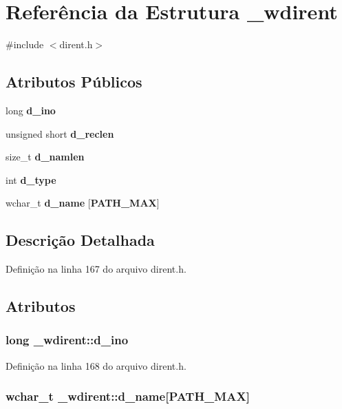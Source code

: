 \section{Referência da Estrutura \+\_\+wdirent}
\label{struct__wdirent}


{\ttfamily \#include $<$dirent.\+h$>$}

\subsection*{Atributos Públicos}
\begin{DoxyCompactItemize}
\item 
long {\bf d\+\_\+ino}
\item 
unsigned short {\bf d\+\_\+reclen}
\item 
size\+\_\+t {\bf d\+\_\+namlen}
\item 
int {\bf d\+\_\+type}
\item 
wchar\+\_\+t {\bf d\+\_\+name} [{\bf P\+A\+T\+H\+\_\+\+M\+AX}]
\end{DoxyCompactItemize}


\subsection{Descrição Detalhada}


Definição na linha 167 do arquivo dirent.\+h.



\subsection{Atributos}
\subsubsection[{d\+\_\+ino}]{\setlength{\rightskip}{0pt plus 5cm}long \+\_\+wdirent\+::d\+\_\+ino}\label{struct__wdirent_ac8cfaf294a0b6a49287d3f384c280c93}


Definição na linha 168 do arquivo dirent.\+h.

\subsubsection[{d\+\_\+name}]{\setlength{\rightskip}{0pt plus 5cm}wchar\+\_\+t \+\_\+wdirent\+::d\+\_\+name[{\bf P\+A\+T\+H\+\_\+\+M\+AX}]}\label{struct__wdirent_a267f915cd36cad5969337a9192cab567}


